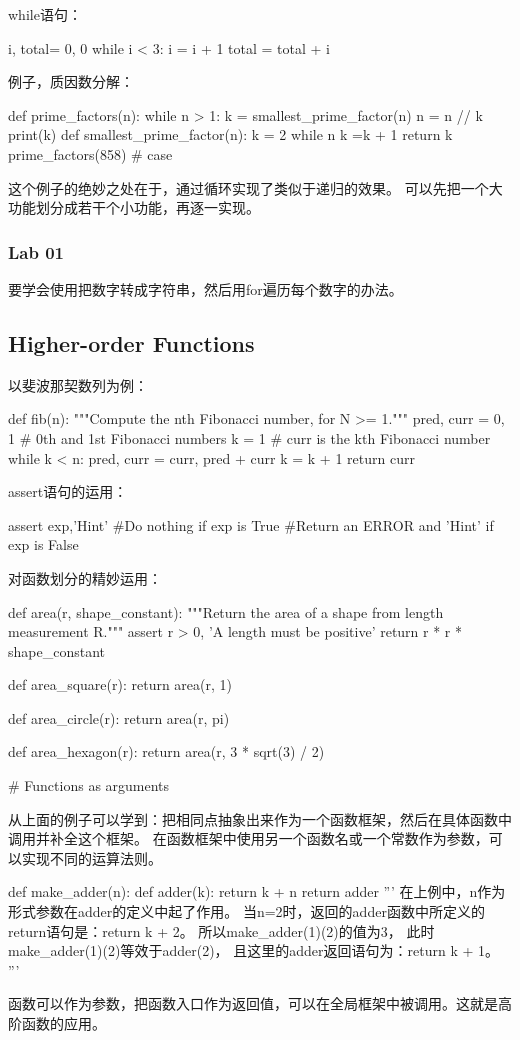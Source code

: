 \documentclass{ctexart}
\begin{document}
while语句：
\begin{python}
    i, total= 0, 0
    while i < 3:
        i = i + 1
        total = total + i
\end{python}

例子，质因数分解：
\begin{python}
    def prime_factors(n):
    while n > 1:
        k = smallest_prime_factor(n)
        n = n // k
        print(k)
def smallest_prime_factor(n):
    k = 2
    while n %
        k =k + 1
    return k
prime_factors(858) # case
\end{python}
这个例子的绝妙之处在于，通过循环实现了类似于递归的效果。
可以先把一个大功能划分成若干个小功能，再逐一实现。 
\subsubsection{Lab 01} 
要学会使用把数字转成字符串，然后用for遍历每个数字的办法。
\subsection{Higher-order Functions}
以斐波那契数列为例：
\begin{python}
    def fib(n): 
 """Compute the nth Fibonacci number, for N >= 1."""
 pred, curr = 0, 1 # 0th and 1st Fibonacci numbers
 k = 1 # curr is the kth Fibonacci number
 while k < n: 
 pred, curr = curr, pred + curr 
 k = k + 1
 return curr
\end{python}

assert语句的运用：

\begin{python}
    assert exp,'Hint'
    #Do nothing if exp is True
    #Return an ERROR and 'Hint' if exp is False
\end{python}

对函数划分的精妙运用：

\begin{python}
    def area(r, shape_constant):
    """Return the area of a shape from length measurement R."""
    assert r > 0, 'A length must be positive'
    return r * r * shape_constant

def area_square(r):
    return area(r, 1)

def area_circle(r):
    return area(r, pi)

def area_hexagon(r):
    return area(r, 3 * sqrt(3) / 2)

# Functions as arguments
\end{python}
从上面的例子可以学到：把相同点抽象出来作为一个函数框架，然后在具体函数中调用并补全这个框架。
在函数框架中使用另一个函数名或一个常数作为参数，可以实现不同的运算法则。
\begin{python}
    def make_adder(n):
        def adder(k):
            return k + n
        return adder 
'''
在上例中，n作为形式参数在adder的定义中起了作用。
当n=2时，返回的adder函数中所定义的return语句是：return k + 2。
所以make_adder(1)(2)的值为3，
此时make_adder(1)(2)等效于adder(2)，
且这里的adder返回语句为：return k + 1。
'''
\end{python}
函数可以作为参数，把函数入口作为返回值，可以在全局框架中被调用。这就是高阶函数的应用。
\end{document}
